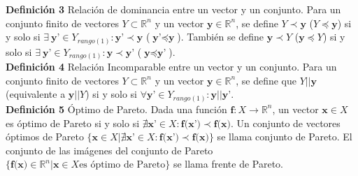 

\noindent\textbf{Definición 3} Relación de dominancia entre un vector y un conjunto. Para un conjunto finito de vectores $Y \subset \mathbb{R}^n$ y un vector $\textbf{y} \in \mathbb{R}^n$, se define $Y \prec \textbf{y}$ ($Y \preceq \textbf{y}$) si y solo si $\exists \ \textbf{y'} \in  Y_{rango(1)}:\textbf{y'} \prec \textbf{y}$ ($\textbf{y'} \preceq \textbf{y}$). También se define $\textbf{y} \prec Y$ ($\textbf{y} \preceq Y $) si y solo si $\exists \ \textbf{y'} \in  Y_{rango(1)}:\textbf{y} \prec \textbf{y'}$ ($\textbf{y} \preceq \textbf{y'}$).\\


\noindent\textbf{Definición 4} Relación Incomparable entre un vector y un conjunto.  Para un conjunto finito de vectores $Y \subset \mathbb{R}^n$ y un vector $\textbf{y} \in \mathbb{R}^n$, se define que $Y || \textbf{y}$ (equivalente a $\textbf{y}||Y$) si y solo si $\forall \textbf{y'}\in Y_{rango(1)}:\textbf{y}||\textbf{y'}$.\\


\noindent \textbf{Definición 5} Óptimo de Pareto. Dada una función $\textbf{f}: X \rightarrow \mathbb{R}^n$, un vector $\textbf{x}\in X$ es óptimo de Pareto si y solo si $\nexists \textbf{x'}\in X: \textbf{f(x')} \prec \textbf{f(x)} $. Un conjunto de vectores óptimos de Pareto $\{ \textbf{x} \in X | \nexists \textbf{x'}\in X: \textbf{f(x')} \prec \textbf{f(x)} \}$ se llama conjunto de Pareto. El conjunto de las imágenes del conjunto de Pareto $\{ \textbf{f(x)} \in \mathbb{R}^n | \textbf{x}\in X \text{es óptimo de Pareto} \}$ se llama frente de Pareto.



